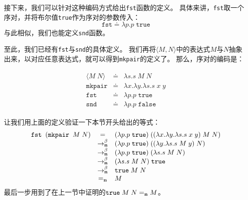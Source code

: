 \documentclass[12pt]{article}
\begin{document}
\indent{}接下来，我们可以针对这种编码方式给出\texttt{fst}函数的定义。
具体来讲，\texttt{fst}取一个序对，并将布尔值\texttt{true}作为序对的参数传入：
\begin{displaymath}
\texttt{fst} \doteq \lambda{}p.p\;\texttt{true}
\end{displaymath}
\noindent{}与此相似，我们也能定义\texttt{snd}函数。

\indent{}至此，我们已经有\texttt{fst}与\texttt{snd}的具体定义。
我们再将$\langle{}M,N\rangle$中的表达式$M$与$N$抽象出来，以对应任意表达式，就可以得到\texttt{mkpair}的定义了。
那么，序对的编码是：
\begin{tcolorbox}[top=-0.8em,left=0mm,right=0mm]
\begin{gather*}
\begin{array}{lcl}
\langle{}M\;N\rangle & \doteq & \lambda{}s.s\;M\;N\\
\texttt{mkpair}      & \doteq & \lambda{}x.\lambda{}y.\lambda{}s.s\;x\;y\\
\texttt{fst}         & \doteq & \lambda{}p.p\;\texttt{true}\\
\texttt{snd}         & \doteq & \lambda{}p.p\;\texttt{false}
\end{array}
\end{gather*}
\end{tcolorbox}

\indent{}让我们用上面的定义验证一下本节开头给出的等式：
\begin{gather*}
\begin{array}{lcl}
\texttt{fst }(\texttt{mkpair }M\;N)
& = & (\lambda{}p.p\;\texttt{true})\;((\lambda{}x.\lambda{}y.\lambda{}s.s\;x\;y)\;M\;N)\\
& \rightarrow_{\bf{n}}^{\beta} & (\lambda{}p.p\;\texttt{true})\;((\lambda{}y.\lambda{}s.s\;M\;y)\;N)\\
& \rightarrow_{\bf{n}}^{\beta} & (\lambda{}p.p\;\texttt{true})\;(\lambda{}s.s\;M\;N)\\
& \rightarrow_{\bf{n}}^{\beta} & (\lambda{}s.s\;M\;N)\; \texttt{true}\\
& \rightarrow_{\bf{n}}^{\beta} & \texttt{true}\;M\;N\\
& =_{\bf{n}} & M
\end{array}
\end{gather*}
\noindent{}最后一步用到了在上一节中证明的$\texttt{true}\;M\;N =_{\bf{n}}M$。
\clearpage
\end{document}
